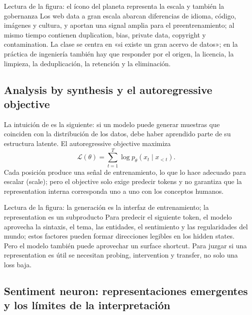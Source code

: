 \begin{knowledgebox}{Lectura de la figura: el ícono del planeta representa la escala y también la gobernanza}
Los web data a gran escala abarcan diferencias de idioma, código, imágenes y cultura, y aportan una signal amplia para el preentrenamiento; al mismo tiempo contienen duplication, bias, private data, copyright y contamination. La clase se centra en «si existe un gran acervo de datos»; en la práctica de ingeniería también hay que responder por el origen, la licencia, la limpieza, la deduplicación, la retención y la eliminación.
\end{knowledgebox}

\subsection{Analysis by synthesis y el autoregressive objective}

La intuición de  es la siguiente: si un modelo puede generar muestras que coinciden con la distribución de los datos, debe haber aprendido parte de su estructura latente. El autoregressive objective maximiza
\[
\mathcal{L}(\theta)=\sum_{t=1}^{T}\log p_\theta(x_t\mid x_{<t}).
\]
Cada posición produce una señal de entrenamiento, lo que lo hace adecuado para escalar (scale); pero el objective solo exige predecir tokens y no garantiza que la representation interna corresponda uno a uno con los conceptos humanos.


\begin{knowledgebox}{Lectura de la figura: la generación es la interfaz de entrenamiento; la representation es un subproducto}
Para predecir el siguiente token, el modelo aprovecha la sintaxis, el tema, las entidades, el sentimiento y las regularidades del mundo; estos factores pueden formar direcciones legibles en los hidden states. Pero el modelo también puede aprovechar un surface shortcut. Para juzgar si una representation es útil se necesitan probing, intervention y transfer, no solo una loss baja.
\end{knowledgebox}

\subsection{Sentiment neuron: representaciones emergentes y los límites de la interpretación}

